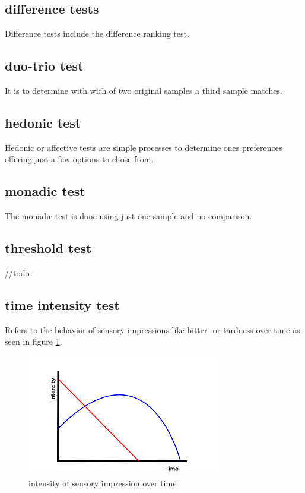 \documentclass[]{scrartcl}
\begin{document}
\subsection{difference tests}
Difference tests include the difference ranking test.

\subsection{duo-trio test}
It is to determine with wich of two original samples a third sample matches.

\subsection{hedonic test}
Hedonic or affective tests are simple processes to determine ones preferences offering
just a few options to chose from.

\subsection{monadic test}
The monadic test is done using just one sample and no comparison.

\subsection{threshold test}
//todo

\subsection{time intensity test}
Refers to the behavior of sensory impressions like bitter -or tardness over time
as seen in figure \ref{fig:time-intensity}.
\begin{figure}[h]
	\centering
	\includegraphics{time-intensity.png}
	\caption{intensity of sensory impression over time}
	\label{fig:time-intensity}
\end{figure}
\end{document}
